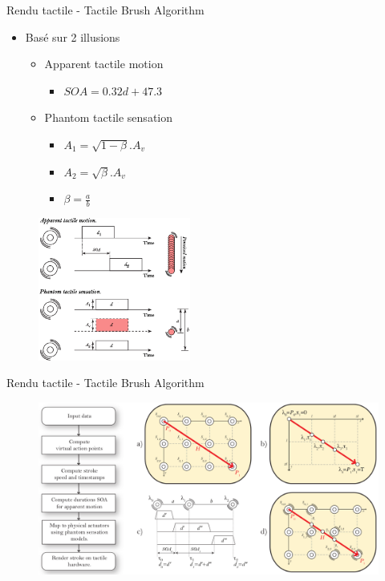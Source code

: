 \documentclass[compress, noflama]{beamer}
\begin{document}
{
\begin{frame}{Rendu tactile - Tactile Brush Algorithm}
\begin{multicols}{2}
\begin{itemize}
\item Basé sur 2 illusions
\begin{itemize}
\item Apparent tactile motion
\begin{itemize}
\item $SOA = 0.32d + 47.3$
\end{itemize}
\item Phantom tactile sensation
\begin{itemize}
\item $A_1 = \sqrt{1-\beta}.A_v$
\item $A_2 = \sqrt{\beta}.A_v$
\item $\beta = \frac{a}{b}$ 
\end{itemize}
\end{itemize}
\end{itemize}

\begin{figure}
\centering
\includegraphics[width=5cm]{images/tactile-illusions}
\end{figure}
\end{multicols}
\end{frame}

\begin{frame}{Rendu tactile - Tactile Brush Algorithm}
\begin{figure}
\centering
\includegraphics[width=\linewidth]{images/tactile_brush}
\end{figure}
\end{frame}
}
\end{document}

